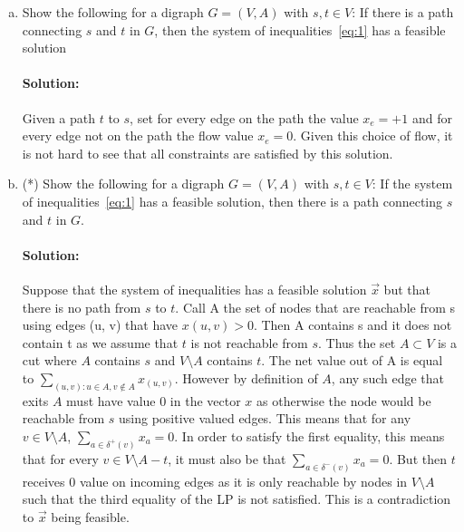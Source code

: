 \documentclass[11pt]{article}
\begin{document}
\begin{enumerate}[a)]
    
    
\item Show the following for a digraph $G = (V,A)$ with $s,t ∈ V$: If there is a path connecting $s$ and $t$ in $G$, then the system of inequalities~\eqref{eq:1} has a feasible solution


\paragraph{Solution:}
Given a path $t$ to $s$, set for every edge on the path the value $x_e = +1$ and for every edge not on the path the flow value $x_e = 0$. Given this choice of flow, it is not hard to see that all constraints are satisfied by this solution. 


  \item (*)  Show the following for a digraph $G = (V,A)$ with $s,t ∈ V$: If  the system of inequalities~\eqref{eq:1} has a feasible solution, then  there is a path connecting $s$ and $t$ in $G$. 
  
  
  \paragraph{Solution:}
  Suppose that the system of inequalities has a feasible solution $\vec{x}$ but that there is no path from $s$ to $t$. Call A the set of nodes that are reachable from s using edges (u, v) that have $x(u, v) > 0$. Then A contains s and it does not
contain t as we assume that $t$ is not reachable from $s$. Thus the set $A \subset V$ is a cut where $A$ contains $s$ and $V \setminus A$ contains $t$. The net value out of A is equal to $\sum_{(u,v): u \in A, v \notin A} x_{(u, v)}$. However by definition of $A$, any such edge that exits $A$ must have value $0$ in the vector $x$ as otherwise the node would be reachable from $s$ using positive valued edges. This means that for any $v \in V \setminus A$, $\sum_{a \in \delta^+(v)} x_a = 0$. In order to satisfy the first equality, this means that for every $v \in V \setminus A - t$, it must also be that $\sum_{a \in \delta^-(v)} x_a = 0$. But then $t$ receives $0$ value on incoming edges as it is only reachable by nodes in $V \setminus A$ such that the third equality of the LP is not satisfied. This is a contradiction to $\vec{x}$ being feasible. 
  


\end{enumerate}
\end{document}
